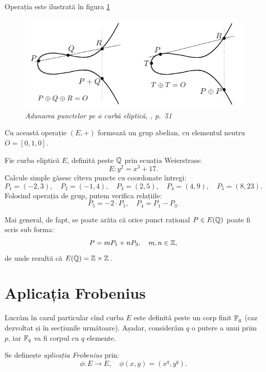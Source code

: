 Operația este ilustrată în figura \ref{fig:pc-adunare}
\begin{figure}[!htbp]
  \centering
  \includegraphics[scale=0.5]{fig/adunare-el.png}
  \caption{\textit{Adunarea punctelor pe o curbă eliptică, \cite{sil09}, p.\ 51}}
  \label{fig:pc-adunare}
\end{figure}

Cu această operație $ (E, +) $ formează un grup abelian, cu elementul neutru
$ O = [0, 1, 0] $.

\begin{example}\label{exm:adunare-pc}
  Fie curba eliptică $ E $, definită peste $ \mathbb{Q} $ prin ecuația Weierstrass:
  \[
    E : y^2 = x^3 + 17.
  \]
  Calcule simple găsesc cîteva puncte cu coordonate întregi:
  \[
    P_1 = (-2, 3), \quad P_2 = (-1, 4), \quad P_3 = (2, 5), \quad P_4 = (4, 9), %
    \quad P_5 = (8, 23).
  \]
  Folosind operația de grup, putem verifica relațiile:
  \[
    P_5 = -2 \cdot P_1, \quad P_4 = P_1 - P_3.
  \]

  Mai general, de fapt, se poate arăta că orice punct rațional $ P \in E(\mathbb{Q}) $
  poate fi scris sub forma:
  \[
    P = mP_1 + nP_3, \quad m, n \in \mathbb{Z},
  \]
  de unde rezultă că $ E(\mathbb{Q}) = \mathbb{Z} \times \mathbb{Z} $.
\end{example}


\section{Aplicația Frobenius}

Lucrăm în cazul particular cînd curba $ E $ este definită peste un corp finit
$ \mathbb{F}_q $ (caz dezvoltat și în secțiunile următoare). Așadar, considerăm
$ q $ o putere a unui prim $ p $, iar $ \mathbb{F}_q $ va fi corpul cu $ q $
elemente.

Se definește \emph{aplicația Frobenius} prin:
\[
  \phi : E \to E, \quad \phi(x, y) = (x^q, y^q).
\]

